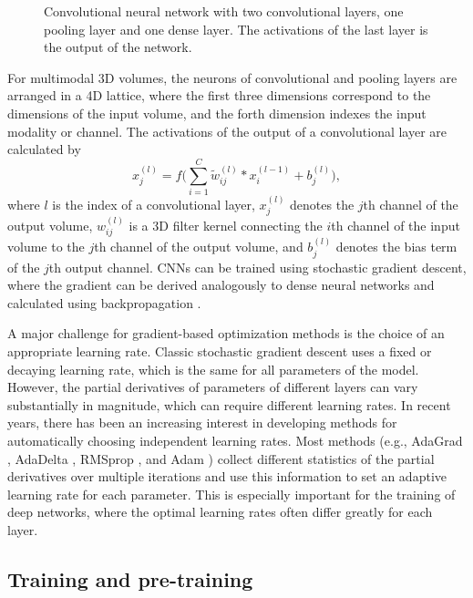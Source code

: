 \begin{figure}
\centering

\caption{Convolutional neural network with two convolutional layers, one pooling
layer and one dense layer. The activations of the last layer is the output of
the network.}
\label{fig:cnn}
\end{figure}

For multimodal 3D volumes, the neurons of convolutional and pooling layers are
arranged in a 4D lattice, where the first three dimensions correspond to the
dimensions of the input volume, and the forth dimension indexes
the input modality or channel. The activations of the output of a
convolutional layer are calculated by
\begin{equation}
x^{(l)}_j = f\Bigg(\sum_{i=1}^C\tilde{w}^{(l)}_{ij}*x^{(l-1)}_i
+ b^{(l)}_j\Bigg),
\end{equation}
where $l$ is the index of a convolutional layer, $x^{(l)}_j$ denotes the
$j$th channel of the output volume, $w^{(l)}_{ij}$ is a 3D filter
kernel connecting the $i$th channel of the input volume to the $j$th channel
of the output volume, and $b_j^{(l)}$ denotes the bias term of the $j$th output
channel. CNNs can be trained using stochastic gradient descent, where the
gradient can be derived analogously to dense neural networks and calculated using
backpropagation \citep{lecun1989,LeCun1998}. 

A major challenge for gradient-based optimization methods is the choice of an
appropriate learning rate. Classic stochastic gradient descent \citep{LeCun1998}
uses a fixed or decaying learning rate, which is the same for all parameters of
the model. However, the partial derivatives of parameters of different layers
can vary substantially in magnitude, which can require different learning rates.
In recent years, there has been an increasing interest in developing methods for
automatically choosing independent learning rates. Most methods (e.g., AdaGrad
\citep{duchi2011}, AdaDelta \citep{zeiler2012}, RMSprop \citep{dauphin2015}, and
Adam \citep{kingma2014}) collect different statistics of the partial derivatives
over multiple iterations and use this information to set an adaptive learning
rate for each parameter. This is especially important for the training of deep
networks, where the optimal learning rates often differ greatly for each layer.


\subsection{Training and pre-training}

